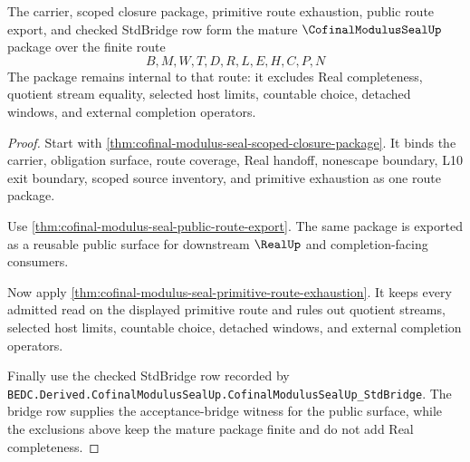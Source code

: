\begin{theorem}
\label{thm:cofinal-modulus-seal-mature-route-package}
The carrier, scoped closure package, primitive route exhaustion, public route export, and checked StdBridge row form the mature $\CofinalModulusSealUp$ package over the finite route
$$
B,M,W,T,D,R,L,E,H,C,P,N
$$
The package remains internal to that route: it excludes Real completeness, quotient stream equality, selected host limits, countable choice, detached windows, and external completion operators.
\end{theorem}
\begin{proof}
Start with \autoref{thm:cofinal-modulus-seal-scoped-closure-package}. It binds the carrier, obligation surface, route coverage, Real handoff, nonescape boundary, L10 exit boundary, scoped source inventory, and primitive exhaustion as one route package.

Use \autoref{thm:cofinal-modulus-seal-public-route-export}. The same package is exported as a reusable public surface for downstream $\RealUp$ and completion-facing consumers.

Now apply \autoref{thm:cofinal-modulus-seal-primitive-route-exhaustion}. It keeps every admitted read on the displayed primitive route and rules out quotient streams, selected host limits, countable choice, detached windows, and external completion operators.

Finally use the checked StdBridge row recorded by \texttt{BEDC.Derived.CofinalModulusSealUp.CofinalModulusSealUp\_StdBridge}. The bridge row supplies the acceptance-bridge witness for the public surface, while the exclusions above keep the mature package finite and do not add Real completeness.
\end{proof}

